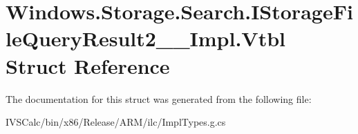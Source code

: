 \hypertarget{struct_windows_1_1_storage_1_1_search_1_1_i_storage_file_query_result2_____impl_1_1_vtbl}{}\section{Windows.\+Storage.\+Search.\+I\+Storage\+File\+Query\+Result2\+\_\+\+\_\+\+Impl.\+Vtbl Struct Reference}
\label{struct_windows_1_1_storage_1_1_search_1_1_i_storage_file_query_result2_____impl_1_1_vtbl}


The documentation for this struct was generated from the following file\+:\begin{DoxyCompactItemize}
\item 
I\+V\+S\+Calc/bin/x86/\+Release/\+A\+R\+M/ilc/Impl\+Types.\+g.\+cs\end{DoxyCompactItemize}
